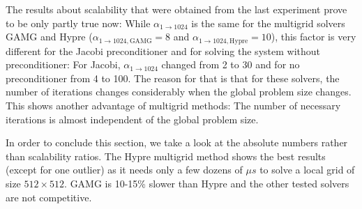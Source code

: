 The results about scalability that were obtained from the last experiment prove to be only partly true now: While $\alpha_{1 \rightarrow 1024}$ is the same for the multigrid solvers GAMG and Hypre ($\alpha_{1 \rightarrow 1024, \textrm{GAMG}} =8$ and $\alpha_{1 \rightarrow 1024, \textrm{Hypre}} =10$), this factor is very different for the Jacobi preconditioner and for solving the system without preconditioner: For Jacobi, $\alpha_{1 \rightarrow 1024}$ changed from 2 to 30 and for no preconditioner from 4 to 100. The reason for that is that for these solvers, the number of iterations changes considerably when the global problem size changes. This shows another advantage of multigrid methods: The number of necessary iterations is almost independent of the global problem size.

In order to conclude this section, we take a look at the absolute numbers rather than scalability ratios. The Hypre multigrid method shows the best results (except for one outlier) as it needs only a few dozens of $\mu s$ to solve a local grid of size $512\times 512$. GAMG is  10-15\% slower than Hypre and the other tested solvers are not competitive.